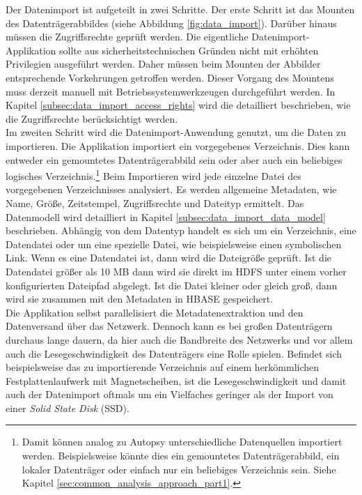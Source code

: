 \noindent
Der Datenimport ist aufgeteilt in zwei Schritte. Der erste Schritt ist das Mounten des Datenträgerabbildes (siehe Abbildung \ref{fig:data_import}). Darüber hinaus müssen die Zugriffsrechte geprüft werden. Die eigentliche Datenimport-Applikation sollte aus sicherheitstechnischen Gründen nicht mit erhöhten Privilegien ausgeführt werden. Daher müssen beim Mounten der Abbilder entsprechende Vorkehrungen getroffen werden. Dieser Vorgang des Mountens muss derzeit manuell mit Betriebssystemwerkzeugen durchgeführt werden. In Kapitel \ref{subsec:data_import_access_rights} wird die detailliert beschrieben, wie die Zugriffsrechte berücksichtigt werden.\\

\noindent
Im zweiten Schritt wird die Datenimport-Anwendung genutzt, um die Daten zu importieren. 
Die Applikation importiert ein vorgegebenes Verzeichnis. Dies kann entweder ein gemountetes Datenträgerabbild sein oder aber auch ein beliebiges logisches Verzeichnis.\footnote{Damit können analog zu Autopsy unterschiedliche Datenquellen importiert werden. Beispielsweise könnte dies ein gemountetes Datenträgerabbild, ein lokaler Datenträger oder einfach nur ein beliebiges Verzeichnis sein. Siehe Kapitel \ref{sec:common_analysis_approach_part1}.} 
Beim Importieren wird jede einzelne Datei des vorgegebenen Verzeichnisses analysiert. Es werden allgemeine Metadaten, wie Name, Größe, Zeitstempel, Zugriffsrechte und Dateityp ermittelt. Das Datenmodell wird detailliert in Kapitel \ref{subsec:data_import_data_model} beschrieben. 
Abhängig von dem Datentyp handelt es sich um ein Verzeichnis, eine Datendatei oder um eine spezielle Datei, wie beispielsweise einen symbolischen Link. Wenn es eine Datendatei ist, dann wird die Dateigröße geprüft. 
Ist die Datendatei größer als 10 MB dann wird sie direkt im HDFS unter einem vorher konfigurierten Dateipfad abgelegt. Ist die Datei kleiner oder gleich groß, dann wird sie zusammen mit den Metadaten in HBASE gespeichert.\\
Die Applikation selbst parallelisiert die Metadatenextraktion und den Datenversand über das Netzwerk. Dennoch kann es bei großen Datenträgern durchaus lange dauern, da hier auch die Bandbreite des Netzwerks und vor allem auch die Lesegeschwindigkeit des Datenträgers eine Rolle spielen. 
Befindet sich beispielsweise das zu importierende Verzeichnis auf einem herkömmlichen Festplattenlaufwerk mit Magnetscheiben, ist die Lesegeschwindigkeit und damit auch der Datenimport oftmals um ein Vielfaches geringer als der Import von einer \textit{Solid State Disk} (SSD).\\ 

